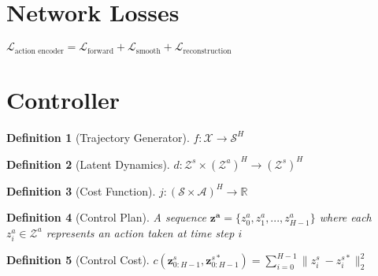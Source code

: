 \documentclass{article}
\newtheorem{definition}{Definition}
\begin{document}
\section{Network Losses}

$\mathcal{L}_\text{action encoder}=\mathcal{L}_\text{forward} + \mathcal{L}_\text{smooth}+\mathcal{L}_\text{reconstruction}$



\section{Controller}

\begin{definition}[Trajectory Generator]
    $f: \mathcal{X} \rightarrow \mathcal{S}^H$
\end{definition}
\begin{definition}[Latent Dynamics]
    $d: \mathcal{Z}^s \times \left(\mathcal{Z}^a\right)^H \rightarrow (\mathcal{Z}^s)^H$
\end{definition}
\begin{definition}[Cost Function]
    $j: (\mathcal{S} \times \mathcal{A})^H \rightarrow \mathbb{R}$
\end{definition}
\begin{definition}[Control Plan]
    A sequence $\mathbf{z^a} = \{z^a_0, z^a_1, ..., z^a_{H-1}\}$ where each $z^a_i \in \mathcal{Z}^a$ represents an action taken at time step $i$
\end{definition}
\begin{definition}[Control Cost]
    $c(\mathbf{z}_{0:H-1}^s, \mathbf{z}_{0:H-1}^{s*}) = \sum\limits_{i=0}^{H-1} \| z^s_i\ - z^{s*}_i \|_2^2$
\end{definition}
\end{document}
